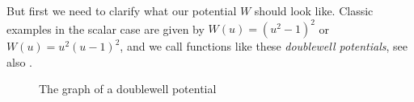 But first we need to clarify what our potential $ W $ should look like. Classic 
examples in the scalar case are given by $ W ( u ) = \left( u^{ 2 } - 1 
\right)^{ 2 } $ or $ W( u ) = u^{ 2 } ( u - 1 )^{ 2 } $, and we call functions 
like these \emph{doublewell potentials}, see also 
.

\begin{figure}[ht]
	\centering
	\caption{The graph of a doublewell potential}
	\label{graph_of_doublewell_potential}
\end{figure}

